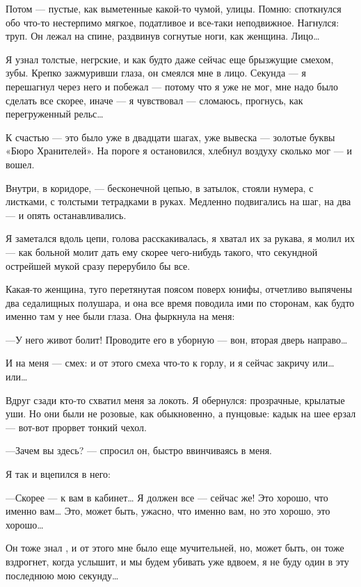 \documentclass[11pt,openany]{book}
\begin{document}
Потом --- пустые, как выметенные какой-то чумой, улицы. Помню: споткнулся обо что-то нестерпимо мягкое, податливое и все-таки неподвижное. Нагнулся: труп. Он лежал на спине, раздвинув согнутые ноги, как женщина. Лицо\ldots{}

Я узнал толстые, негрские, и как будто даже сейчас еще брызжущие смехом, зубы. Крепко зажмуривши глаза, он смеялся мне в лицо. Секунда --- я перешагнул через него и побежал --- потому что я уже не мог, мне надо было сделать все скорее, иначе --- я чувствовал --- сломаюсь, прогнусь, как перегруженный рельс\ldots{}

К счастью --- это было уже в двадцати шагах, уже вывеска --- золотые буквы «Бюро Хранителей». На пороге я остановился, хлебнул воздуху сколько мог --- и вошел.

Внутри, в коридоре, --- бесконечной цепью, в затылок, стояли нумера, с листками, с толстыми тетрадками в руках. Медленно подвигались на шаг, на два --- и опять останавливались.

Я заметался вдоль цепи, голова расскакивалась, я хватал их за рукава, я молил их --- как больной молит дать ему скорее чего-нибудь такого, что секундной острейшей мукой сразу перерубило бы все.

Какая-то женщина, туго перетянутая поясом поверх юнифы, отчетливо выпячены два седалищных полушара, и она все время поводила ими по сторонам, как будто именно там у нее были глаза. Она фыркнула на меня:

---У него живот болит! Проводите его в уборную --- вон, вторая дверь направо\ldots{}

И на меня --- смех: и от этого смеха что-то к горлу, и я сейчас закричу или\ldots{} или\ldots{}

Вдруг сзади кто-то схватил меня за локоть. Я обернулся: прозрачные, крылатые уши. Но они были не розовые, как обыкновенно, а пунцовые: кадык на шее ерзал --- вот-вот прорвет тонкий чехол.

---Зачем вы здесь? --- спросил он, быстро ввинчиваясь в меня.

Я так и вцепился в него:

---Скорее --- к вам в кабинет\ldots{} Я должен все --- сейчас же! Это хорошо, что именно вам\ldots{} Это, может быть, ужасно, что именно вам, но это хорошо, это хорошо\ldots{}

Он тоже знал , и от этого мне было еще мучительней, но, может быть, он тоже вздрогнет, когда услышит, и мы будем убивать уже вдвоем, я не буду один в эту последнюю мою секунду\ldots{}
\end{document}
